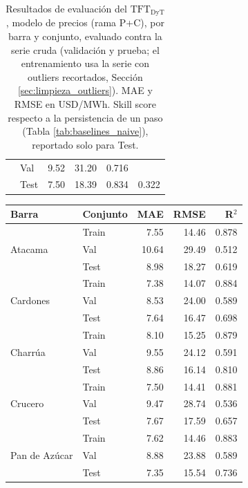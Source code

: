 \begin{table}[htbp]
\begin{tabular}{llrrrr}
            & Val   & 9.52 & 31.20 & 0.716 & \\
            & Test  & 7.50 & 18.39 & 0.834 & 0.322 \\
        \bottomrule
    \end{tabular}
    \vspace{0.2cm}
    \caption{Resultados de evaluación del $\text{TFT}_\text{DyT}$, modelo de precios (rama P+C), por barra y conjunto, evaluado contra la serie cruda (validación y prueba; el entrenamiento usa la serie con outliers recortados, Sección \ref{sec:limpieza_outliers}). MAE y RMSE en USD/MWh. Skill score respecto a la persistencia de un paso (Tabla \ref{tab:baselines_naive}), reportado solo para Test.}
    \label{tab:tft_dyt_precios_resultados}
\end{table}

\begin{table}[htbp]
    \centering
    \small
    \begin{tabular}{llrrr}
        \toprule
        Barra & Conjunto & MAE & RMSE & R$^2$ \\
        \midrule
        \multirow{3}{*}{Atacama}
            & Train & 7.55 & 14.46 & 0.878 \\
            & Val   & 10.64 & 29.49 & 0.512 \\
            & Test  & 8.98 & 18.27 & 0.619 \\
        \midrule
        \multirow{3}{*}{Cardones}
            & Train & 7.38 & 14.07 & 0.884 \\
            & Val   & 8.53 & 24.00 & 0.589 \\
            & Test  & 7.64 & 16.47 & 0.698 \\
        \midrule
        \multirow{3}{*}{Charrúa}
            & Train & 8.10 & 15.25 & 0.879 \\
            & Val   & 9.55 & 24.12 & 0.591 \\
            & Test  & 8.86 & 16.14 & 0.810 \\
        \midrule
        \multirow{3}{*}{Crucero}
            & Train & 7.50 & 14.41 & 0.881 \\
            & Val   & 9.47 & 28.74 & 0.536 \\
            & Test  & 7.67 & 17.59 & 0.657 \\
        \midrule
        \multirow{3}{*}{Pan de Azúcar}
            & Train & 7.62 & 14.46 & 0.883 \\
            & Val   & 8.88 & 23.88 & 0.589 \\
            & Test  & 7.35 & 15.54 & 0.736 \\

\end{tabular}
\end{table}
